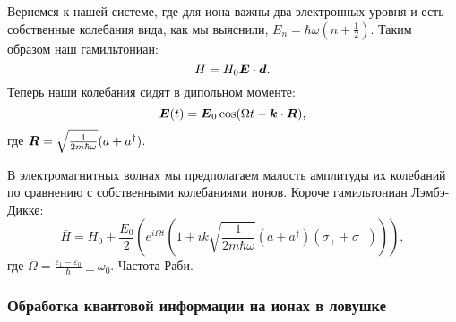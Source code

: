 Вернемся к нашей системе, где для иона важны два электронных уровня и есть собственные колебания вида, как мы выяснили, $E_n = \hbar \omega \left(n+\frac{1}{2}\right)$.
Таким образом наш гамильтониан:
\begin{equation*}
	H = H_0 \mbox{\boldmath $E$} \cdot \mbox{\boldmath $d$}.
\end{equation*}
Теперь наши колебания сидят в дипольном моменте:
\begin{equation*}
	\mbox{\boldmath $E$}(t) = \mbox{\boldmath $E$}_0 \cos (\Omega t - \mbox{\boldmath $k$} \cdot \mbox{\boldmath $R$}),
\end{equation*}
где $\mbox{\boldmath $R$} = \sqrt{\frac{1}{2 m \hbar \omega}}(a + a^\dag)$.

В электромагнитных волнах мы предполагаем малость амплитуды их колебаний по сравнению с собственными колебаниями ионов.
Короче гамильтониан Лэмбэ-Дикке:
\begin{equation*}
	\bar{H} = H_0 + \frac{E_0}{2}\left(e^{i \Omega t} \left(1 + i k \sqrt{\frac{1}{2 m \hbar \omega}}(a + a^\dag) (\sigma_+ + \sigma_-)\right)\right),
\end{equation*}
где $\Omega = \frac{\varepsilon_1 - \varepsilon_0}{\hbar} \pm \omega_0$. Частота Раби.

\subsubsection*{Обработка квантовой информации на ионах в ловушке}